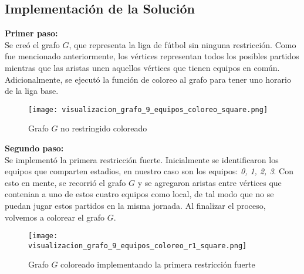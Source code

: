 \documentclass[11pt]{article}
\begin{document}
\begin{multicols}{2}
        \section{Implementación de la Solución}
            \textbf{Primer paso:}\\ 
            Se creó el grafo $G$, que representa la liga de fútbol sin ninguna restricción. Como fue mencionado anteriormente, los vértices representan todos los posibles partidos
            mientras que las aristas unen aquellos vértices que tienen equipos en común.
            Adicionalmente, se ejecutó la función de coloreo al grafo para tener uno horario de la liga base.
            \begin{figure}[H]
                \begin{center}
                    \texttt{[image: visualizacion\_grafo\_9\_equipos\_coloreo\_square.png]}  
                \caption{Grafo $G$ no restringido coloreado}
                \end{center}
            \end{figure}
            \textbf{Segundo paso:}\\
            Se implementó la primera restricción fuerte.
            Inicialmente se identificaron los equipos que comparten estadios, en nuestro caso son los equipos: \textit{0, 1, 2, 3}. 
            Con esto en mente, se recorrió el grafo $G$ y se agregaron aristas entre vértices que contenian a uno de estos cuatro equipos como local,
            de tal modo que no se puedan jugar estos partidos en la misma jornada. Al finalizar el proceso, volvemos a colorear el grafo $G$.
            \begin{figure}[H]
                \begin{center}
                    \texttt{[image: visualizacion\_grafo\_9\_equipos\_coloreo\_r1\_square.png]}  
                \caption{Grafo $G$ coloreado implementando la primera restricción fuerte}
                \end{center}
            \end{figure}


\end{multicols}
\end{document}
